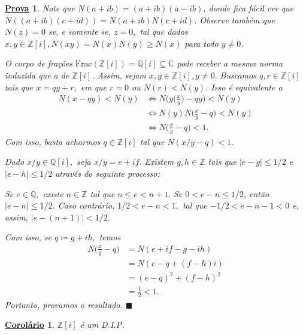 \documentclass{article}
\newtheorem*{proof*}{\underline{Prova}}
\newtheorem*{crl*}{\underline{Corolário}}
\renewcommand\qedsymbol{$\blacksquare$}
\begin{document}
 \begin{proof*}
  Note que \(N(a+ib) = (a+ib)(a-ib)\), donde fica fácil ver que \(N((a+ib)(c+id)) = N(a+ib)N(c+id)\).
Observe também que \(N(z) = 0\) se, e somente se, \(z = 0,\) tal que dados \(x, y\in \mathbb{Z}[i], N(xy) = N(x)N(y)
\geq N(x)\) para todo \(y\neq0\).

  O corpo de frações \(\mathrm{Frac}(\mathbb{Z}[i]) = \mathbb{Q}[i] \subseteq{\mathbb{C}}\) pode receber a mesma norma
induzida que a de \(\mathbb{Z}[i]\). Assim, sejam \(x, y\in \mathbb{Z}[i], y\neq0.\) Buscamos \(q, r\in \mathbb{Z}[i]\) tais que
 \(x = qy + r,\) em que \(r=0\) ou \(N(r) < N(y)\). Isso é equivalente a
\begin{align*}
  N(x-qy) < N(y) &\Longleftrightarrow N \biggl(y \biggl(\frac{x}{y}\biggr) - qy\biggr) < N(y)\\
                 &\Longleftrightarrow N(y) N \biggl(\frac{x}{y}-q\biggr) < N(y)\\
                 &\Longleftrightarrow N \biggl(\frac{x}{y} - q\biggr) < 1.
\end{align*}
  Com isso, basta acharmos \(q\in \mathbb{Z}[i]\) tal que \(N(x/y - q) < 1.\)

  Dado \(x/y\in \mathbb{Q}[i],\) seja \(x/y = e + if.\) Existem \(g, h\in \mathbb{Z}\)
tais que \(|e-g|\leq 1/2\) e \(|e-h|\leq 1/2\) através do seguinte processo:

  Se \(e\in \mathbb{Q},\) existe \(n\in \mathbb{Z}\) tal que \(n\leq e < n+1.\) Se \(0 < e-n\leq 1/2\),
então \(|e-n|\leq 1/2\). Caso contrário, \(1/2 < e-n < 1,\) tal que \(-1/2 < e - n - 1 < 0\) e, assim,
 \(|e-(n+1)| < 1/2\).

  Com isso, se \(q\coloneqq g + ih,\) temos 
 \begin{align*}
   N \biggl(\frac{x}{y} - q\biggr) &= N(e + if - g - ih)\\
                                   &= N(e - q + (f-h)i)\\
                                   &= (e-q)^{2} + (f-h)^{2}\\
                                   &=\frac{1}{2} < 1.
 \end{align*}
  Portanto, provamos o resultado. \qedsymbol
 \end{proof*}
\begin{crl*}
  \(\mathbb{Z}[i]\) é um D.I.P.
\end{crl*}
\end{document}
